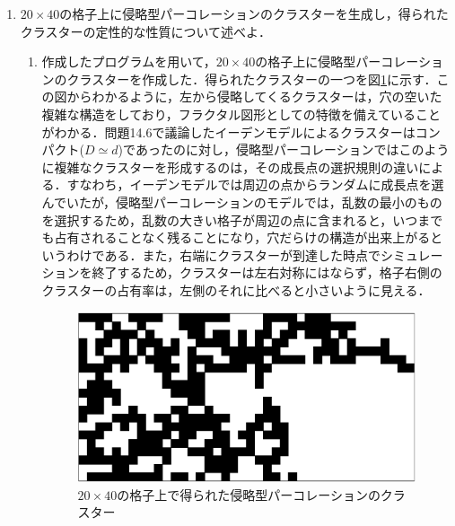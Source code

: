 \documentclass{jsarticle}
\begin{document}
    \begin{enumerate}
        \renewcommand{\labelenumi}{\alph{enumi}.}
        \renewcommand{\labelenumii}{}
        
        \item $20\times 40$の格子上に侵略型パーコレーションのクラスターを生成し，得られたクラスターの定性的な性質について述べよ．
            
            \begin{enumerate}
                \item 作成したプログラムを用いて，$20 \times 40$の格子上に侵略型パーコレーションのクラスターを作成した．得られたクラスターの一つを図\ref{fig:14-7-f1}に示す．この図からわかるように，左から侵略してくるクラスターは，穴の空いた複雑な構造をしており，フラクタル図形としての特徴を備えていることがわかる．問題14.6で議論したイーデンモデルによるクラスターはコンパクト($D\simeq d$)であったのに対し，侵略型パーコレーションではこのように複雑なクラスターを形成するのは，その成長点の選択規則の違いによる．すなわち，イーデンモデルでは周辺の点からランダムに成長点を選んでいたが，侵略型パーコレーションのモデルでは，乱数の最小のものを選択するため，乱数の大きい格子が周辺の点に含まれると，いつまでも占有されることなく残ることになり，穴だらけの構造が出来上がるというわけである．また，右端にクラスターが到達した時点でシミュレーションを終了するため，クラスターは左右対称にはならず，格子右側のクラスターの占有率は，左側のそれに比べると小さいように見える．
                
               \begin{figure}[H]
                   \begin{center}
                       \includegraphics[width=12.0cm]{figure_1.pdf}
                       \caption{$20\times 40$の格子上で得られた侵略型パーコレーションのクラスター}
                       \label{fig:14-7-f1}
                   \end{center}
               \end{figure}
               

\end{enumerate}
\end{enumerate}
\end{document}

